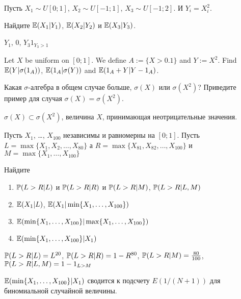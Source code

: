 \begin{problem}
Пусть $X_{1}\sim U[0;1]$, $X_{2}\sim U[-1;1]$, $X_{3}\sim U[-1;2]$. И $Y_{i}=X_{i}^{2}$.

Найдите $ \E(X_{1}|Y_{1}) $, $ \E(X_{2}|Y_{2}) $ и $ \E(X_{3}|Y_{3}) $.

\begin{sol}
 $Y_{1}$, $0$, $Y_{3}1_{Y_{3}>1}$
\end{sol}
\end{problem}

\begin{problem}
Let $ X $ be uniform on $[0;1]$. We define $ A:=\{X>0.1\} $ and $ Y:=X^{2} $. Find $ \E(Y|\sigma(1_{A})) $, $\E(1_{A}|\sigma(Y))$ and $\E(1_{A}+Y|Y-1_{A})$.

\begin{sol}

\end{sol}
\end{problem}

\begin{problem}
Какая $\sigma$-алгебра в общем случае больше, $\sigma(X)$ или $\sigma(X^2)$? Приведите пример для случая $\sigma(X)=\sigma(X^2)$.

\begin{sol}
$\sigma(X) \subset \sigma(X^2)$, величина $X$, принимающая неотрицательные значения.
\end{sol}
\end{problem}

\begin{problem}
Пусть $ X_{1} $, \ldots, $ X_{100} $ независимы и равномерны на $ [0;1] $. Пусть $ L=\max\{X_{1},X_{2},\ldots, X_{80}\} $ а $ R=\max\{X_{81},X_{82},\ldots,X_{100}\} $ и $ M=\max\{X_{1},\ldots,X_{100}\} $

Найдите
\begin{enumerate}
\item $ \P(L>R|L)$ и $ \P(L>R|R) $ и $ \P(L>R|M)$, $\P(L>R|L,M) $
\item $\E( X_1 | L )$, $\E( X_1 | \min \{ X_1, \ldots, X_{100} \})$
\item $\E( \min \{ X_1, \ldots, X_{100} \} | \max \{ X_1, \ldots, X_{100} \})$
\item $\E(\min \{ X_1, \ldots, X_{100} \} | X_1)$
\end{enumerate}


\begin{sol}
$ \P(L>R|L)=L^{20}$,  $ \P(L>R|R)=1-R^{80} $, $ \P(L>R|M)=\frac{80}{100}$, $\P(L>R|L,M)=1-1_{L>M} $

$\E(\min \{ X_1, \ldots, X_{100} \} | X_1)$ сводится к подсчету $E(1/(N+1))$ для биномиальной случайной величины.
\end{sol}
\end{problem}

